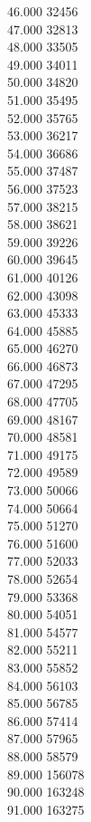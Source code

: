 { 46.000	32456 \\
 47.000	32813 \\
 48.000	33505 \\
 49.000	34011 \\
 50.000	34820 \\
 51.000	35495 \\
 52.000	35765 \\
 53.000	36217 \\
 54.000	36686 \\
 55.000	37487 \\
 56.000	37523 \\
 57.000	38215 \\
 58.000	38621 \\
 59.000	39226 \\
 60.000	39645 \\
 61.000	40126 \\
 62.000	43098 \\
 63.000	45333 \\
 64.000	45885 \\
 65.000	46270 \\
 66.000	46873 \\
 67.000	47295 \\
 68.000	47705 \\
 69.000	48167 \\
 70.000	48581 \\
 71.000	49175 \\
 72.000	49589 \\
 73.000	50066 \\
 74.000	50664 \\
 75.000	51270 \\
 76.000	51600 \\
 77.000	52033 \\
 78.000	52654 \\
 79.000	53368 \\
 80.000	54051 \\
 81.000	54577 \\
 82.000	55211 \\
 83.000	55852 \\
 84.000	56103 \\
 85.000	56785 \\
 86.000	57414 \\
 87.000	57965 \\
 88.000	58579 \\
 89.000	156078 \\
 90.000	163248 \\
 91.000	163275 \\
}
